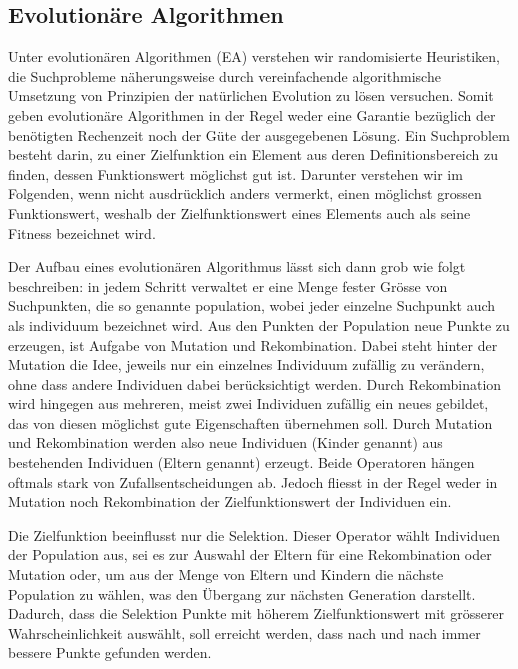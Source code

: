 \subsection{Evolutionäre Algorithmen}
\flqq Unter evolutionären Algorithmen (EA) verstehen wir randomisierte Heuristiken, die Suchprobleme näherungsweise durch vereinfachende algorithmische Umsetzung von Prinzipien der natürlichen Evolution zu lösen versuchen. Somit geben evolutionäre Algorithmen in der Regel weder eine Garantie bezüglich der benötigten Rechenzeit noch der Güte der ausgegebenen Lösung. Ein Suchproblem besteht darin, zu einer Zielfunktion ein Element aus deren Definitionsbereich zu finden, dessen Funktionswert möglichst gut ist. Darunter verstehen wir im Folgenden, wenn nicht ausdrücklich anders vermerkt, einen möglichst grossen Funktionswert, weshalb der Zielfunktionswert eines Elements auch als seine Fitness bezeichnet wird.

Der Aufbau eines evolutionären Algorithmus lässt sich dann grob wie folgt beschreiben: in jedem Schritt verwaltet er eine Menge fester Grösse von Suchpunkten, die so genannte \Gls{population}, wobei jeder einzelne Suchpunkt auch als \Gls{individuum} bezeichnet wird. Aus den Punkten der Population neue Punkte zu erzeugen, ist Aufgabe von Mutation und Rekombination. Dabei steht hinter der Mutation die Idee, jeweils nur ein einzelnes Individuum zufällig zu verändern, ohne dass andere Individuen dabei berücksichtigt werden. Durch Rekombination wird hingegen aus mehreren, meist zwei Individuen zufällig ein neues gebildet, das von diesen möglichst gute Eigenschaften übernehmen soll. Durch Mutation und Rekombination werden also neue Individuen (Kinder genannt) aus bestehenden Individuen (Eltern genannt) erzeugt. Beide Operatoren hängen oftmals stark von Zufallsentscheidungen ab. Jedoch fliesst in der Regel weder in Mutation noch Rekombination der Zielfunktionswert der Individuen ein.

Die Zielfunktion beeinflusst nur die Selektion. Dieser Operator wählt Individuen der Population aus, sei es zur Auswahl der Eltern für eine Rekombination oder Mutation oder, um aus der Menge von Eltern und Kindern die nächste Population zu wählen, was den Übergang zur nächsten Generation darstellt. Dadurch, dass die Selektion Punkte mit höherem Zielfunktionswert mit grösserer Wahrscheinlichkeit auswählt, soll erreicht werden, dass nach und nach immer bessere Punkte gefunden werden.\frqq \cite{droste}

